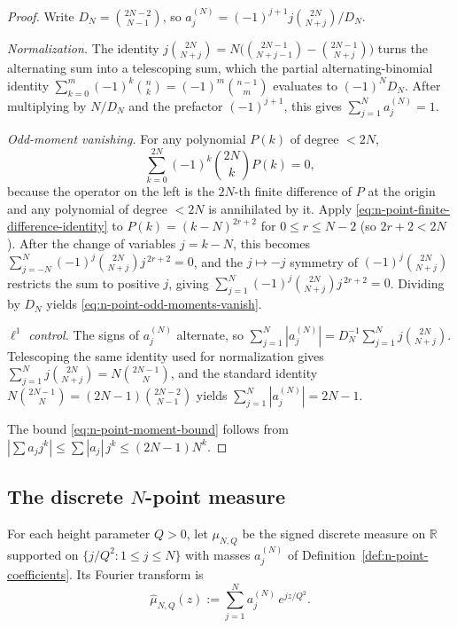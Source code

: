 \begin{proof}
Write \(D_N=\binom{2N-2}{N-1}\), so
\(a_j^{(N)} = (-1)^{j+1} j \binom{2N}{N+j} / D_N\).

\emph{Normalization.}  The identity
\(j\binom{2N}{N+j} = N\bigl(\binom{2N-1}{N+j-1}-\binom{2N-1}{N+j}\bigr)\)
turns the alternating sum into a telescoping sum, which the partial
alternating-binomial identity
\(\sum_{k=0}^m(-1)^k\binom{n}{k}=(-1)^m\binom{n-1}{m}\) evaluates to
\((-1)^N D_N\).  After multiplying by \(N/D_N\) and the prefactor
\((-1)^{j+1}\), this gives
\(\sum_{j=1}^N a_j^{(N)} = 1\).

\emph{Odd-moment vanishing.}  For any polynomial \(P(k)\) of degree
\(<2N\),
\begin{equation}
\label{eq:n-point-finite-difference-identity}
        \sum_{k=0}^{2N}(-1)^k\binom{2N}{k}P(k) = 0,
\end{equation}
because the operator on the left is the \(2N\)-th finite difference of
\(P\) at the origin and any polynomial of degree \(<2N\) is annihilated
by it.  Apply \eqref{eq:n-point-finite-difference-identity} to
\(P(k)=(k-N)^{2r+2}\) for \(0\le r\le N-2\) (so \(2r+2 < 2N\)).  After
the change of variables \(j=k-N\), this becomes
\(\sum_{j=-N}^N(-1)^j\binom{2N}{N+j}j^{\,2r+2}=0\), and the
\(j\mapsto -j\) symmetry of \((-1)^j\binom{2N}{N+j}\) restricts the sum
to positive \(j\), giving
\(\sum_{j=1}^N(-1)^j\binom{2N}{N+j}j^{\,2r+2}=0\).  Dividing by \(D_N\)
yields \eqref{eq:n-point-odd-moments-vanish}.

\emph{\(\ell^1\) control.}  The signs of \(a_j^{(N)}\) alternate, so
\(\sum_{j=1}^N|a_j^{(N)}| = D_N^{-1}\sum_{j=1}^N j\binom{2N}{N+j}\).
Telescoping the same identity used for normalization gives
\(\sum_{j=1}^N j\binom{2N}{N+j}=N\binom{2N-1}{N}\), and the standard
identity \(N\binom{2N-1}{N}=(2N-1)\binom{2N-2}{N-1}\) yields
\(\sum_{j=1}^N|a_j^{(N)}|=2N-1\).

The bound \eqref{eq:n-point-moment-bound} follows from
\(|\sum a_j j^k| \le \sum|a_j|\,j^k \le (2N-1)N^k\).
\end{proof}

\subsection{The discrete \(N\)-point measure}
\label{subsec:n-point-measure}

\begin{definition}
\label{def:n-point-measure}
For each height parameter \(Q>0\), let \(\mu_{N,Q}\) be the signed
discrete measure on \(\mathbb R\) supported on
\(\{j/Q^2:1\le j\le N\}\) with masses \(a_j^{(N)}\) of
Definition~\ref{def:n-point-coefficients}.  Its Fourier transform is
\begin{equation}
\label{eq:mu-hat-N-Q}
        \widehat\mu_{N,Q}(z)
        := \sum_{j=1}^N a_j^{(N)}\, e^{j z / Q^2}.
\end{equation}
\end{definition}

